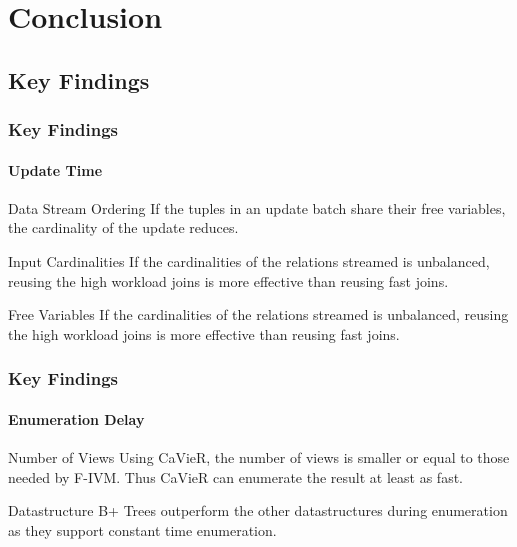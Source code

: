 \documentclass[
	11pt, %
]{beamer}
\begin{document}
\section{Conclusion}
\subsection{Key Findings}
\begin{frame}
	\frametitle{Key Findings}
	\framesubtitle{Update Time}
	\begin{block}{Data Stream Ordering}
		If the tuples in an update batch share their free variables, the cardinality of the update reduces.
	\end{block}
	\begin{block}{Input Cardinalities}
		If the cardinalities of the relations streamed is unbalanced, reusing the high workload joins is more effective than reusing fast joins.
	\end{block}
	\begin{block}{Free Variables}
		If the cardinalities of the relations streamed is unbalanced, reusing the high workload joins is more effective than reusing fast joins.
	\end{block}
\end{frame}

\begin{frame}
	\frametitle{Key Findings}
	\framesubtitle{Enumeration Delay}
	\begin{block}{Number of Views}
		Using CaVieR, the number of views is smaller or equal to those needed by F-IVM. Thus CaVieR can enumerate the result at least as fast.
	\end{block}
	\begin{block}{Datastructure}
		B+ Trees outperform the other datastructures during enumeration as they support constant time enumeration.
	\end{block}
\end{frame}
\end{document}
